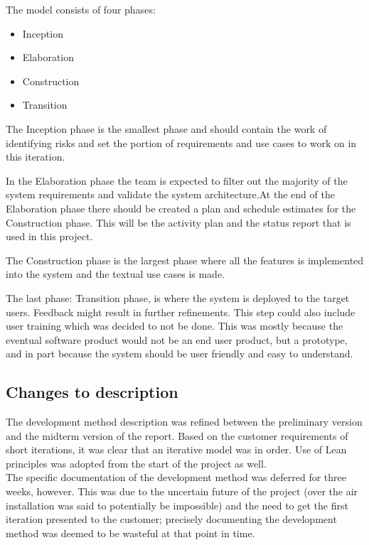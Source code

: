 The model consists of four phases:

\begin{itemize}
\item{Inception}
\item{Elaboration}
\item{Construction}
\item{Transition}
\end{itemize}

The Inception phase is the smallest phase and should contain the work of identifying risks and set the portion of requirements and use cases to work on in this iteration.

In the Elaboration phase the team is expected to filter out the majority of the system requirements and validate the system architecture.At the end of the Elaboration phase there should be created a plan and schedule estimates for the Construction phase. This will be the activity plan and the status report that is used in this project.

The Construction phase is the largest phase where all the features is implemented into the system and the textual use cases is made.

The last phase: Transition phase, is where the system is deployed to the target users. Feedback might result in further refinements. This step could also include user training which was decided to not be done. This was mostly because the eventual software product would not be an end user product, but a prototype, and in part because the system should be user friendly and easy to understand.

\subsection{Changes to description}
The development method description was refined between the preliminary version and the midterm version of the report. Based on the customer requirements of short iterations, it was clear that an iterative model was in order. Use of Lean principles was adopted from the start of the project as well.\\
The specific documentation of the development method was deferred for three weeks, however. This was due to the uncertain future of the project (over the air installation was said to potentially be impossible) and the need to get the first iteration presented to the customer; precisely documenting the development method was deemed to be wasteful at that point in time.


